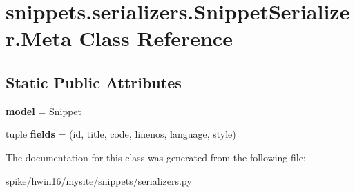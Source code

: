 \hypertarget{classsnippets_1_1serializers_1_1_snippet_serializer_1_1_meta}{}\section{snippets.\+serializers.\+Snippet\+Serializer.\+Meta Class Reference}
\label{classsnippets_1_1serializers_1_1_snippet_serializer_1_1_meta}
\subsection*{Static Public Attributes}
\begin{DoxyCompactItemize}
\item 
\mbox{\label{classsnippets_1_1serializers_1_1_snippet_serializer_1_1_meta_a015ad7c59459713a3f7c2c3d2dd5834f}} 
{\bfseries model} = \mbox{\hyperlink{classsnippets_1_1models_1_1_snippet}{Snippet}}
\item 
\mbox{\label{classsnippets_1_1serializers_1_1_snippet_serializer_1_1_meta_ad6280ba8307386556c7e79538405b7f6}} 
tuple {\bfseries fields} = (\textquotesingle{}id\textquotesingle{}, \textquotesingle{}title\textquotesingle{}, \textquotesingle{}code\textquotesingle{}, \textquotesingle{}linenos\textquotesingle{}, \textquotesingle{}language\textquotesingle{}, \textquotesingle{}style\textquotesingle{})
\end{DoxyCompactItemize}


The documentation for this class was generated from the following file\+:\begin{DoxyCompactItemize}
\item 
spike/hwin16/mysite/snippets/serializers.\+py\end{DoxyCompactItemize}
